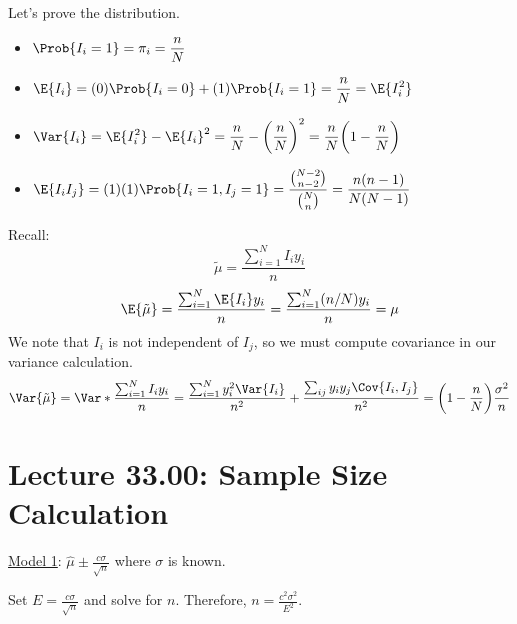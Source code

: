 Let's prove the distribution.
\begin{itemize}
    \item $ \displaystyle \Prob{I_i=1}=\pi_i=\frac{n}{N} $
    \item $ \displaystyle \E{I_i}=(0)\Prob{I_i=0}+(1)\Prob{I_i=1}=\frac{n}{N}=\E{I_i^2} $
    \item $ \displaystyle \Var{I_i}=\E{I_i^2}-\E{I_i}^2=\frac{n}{N} -\biggl(\frac{n}{N}\biggr)^2=\frac{n}{N} \biggl(1-\frac{n}{N} \biggr)  $
    \item $ \displaystyle \E{I_i I_j}=(1)(1)\Prob{I_i=1,I_j=1}=\frac{\binom{N-2}{n-2}}{\binom{N}{n}}=\frac{n(n-1)}{N(N-1)}  $
\end{itemize}
Recall:
\[ \tilde{\mu}=\frac{\sum_{i=1}^{N} I_i y_i}{n} \]
\[ \E{\tilde{\mu}}=\frac{\sum_{i=1}^{N} \E{I_i}y_i}{n}=\frac{\sum_{i=1}^{N} (n/N) y_i}{n}=\mu  \]
We note that $ I_i $ is not independent of $ I_j $, so we must compute covariance in our variance calculation.
\[ \Var{\tilde{\mu}}=\Var*{\frac{\sum_{i=1}^{N} I_i y_i}{n}}=
    \frac{\sum_{i=1}^{N} y_i^2\Var{I_i}}{n^2}+\frac{\sum_{ij}y_i y_j\Cov{I_i,I_j}}{n^2}=
    \biggl(1-\frac{n}{N} \biggr)\frac{\sigma^2}{n}   \]

\section{Lecture 33.00: Sample Size Calculation}
\underline{Model 1}:
$ \displaystyle  \hat{\mu}\pm \frac{c\sigma}{\sqrt{n}} $ where $\sigma$ is known.

Set $ E=\displaystyle \frac{c\sigma}{\sqrt{n}} $ and solve for $ n $. Therefore,
$ \displaystyle n=\frac{c^2\sigma^2}{E^2} $.

